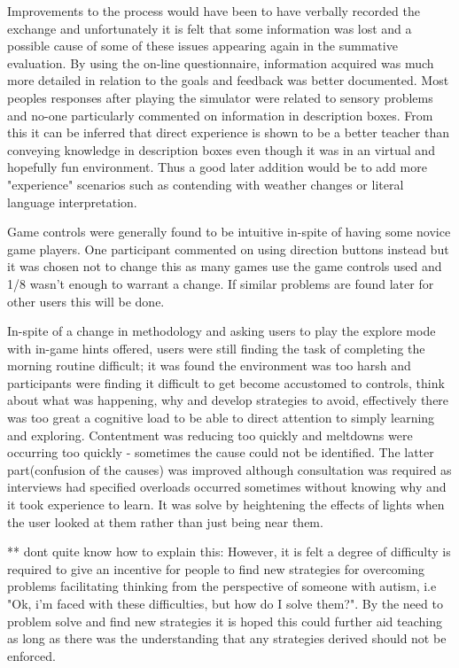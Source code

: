 \documentclass[11pt]{report}
\begin{document}
Improvements to the process would have been to have verbally recorded the exchange and unfortunately it is felt that some information was lost and a possible cause of some of these issues appearing again in the summative evaluation. By using the on-line questionnaire, information acquired was much more detailed in relation to the goals and feedback was better documented. Most peoples responses after playing the simulator were related to sensory problems and no-one particularly commented on information in description boxes. From this it can be inferred that direct experience is shown to be a better teacher than conveying knowledge in description boxes even though it was in an virtual and hopefully fun environment. Thus a good later addition would be to add more "experience" scenarios such as contending with weather changes or literal language interpretation.  

Game controls were generally found to be intuitive in-spite of having some novice game players. One participant commented on using direction buttons instead but it was chosen not to change this as many games use the game controls used and 1/8 wasn't enough to warrant a change. If similar problems are found later for other users this will be done. 

In-spite of a change in methodology and asking users to play the explore mode with in-game hints offered, users were still finding the task of completing the morning routine difficult; it was found the environment was too harsh and participants were finding it difficult to get become accustomed to controls, think about what was happening, why and develop strategies to avoid, effectively there was too great a cognitive load to be able to direct attention to simply learning and exploring. Contentment was reducing too quickly and meltdowns were occurring too quickly - sometimes the cause could not be identified. The latter part(confusion of the causes) was improved although consultation was required as interviews had specified overloads occurred sometimes without knowing why and it took experience to learn. It was solve by heightening the effects of lights when the user looked at them rather than just being near them.

** dont quite know how to explain this: However, it is felt a degree of difficulty is required to give an incentive for people to find new strategies for overcoming problems facilitating thinking from the perspective of someone with autism, i.e "Ok, i'm faced with these difficulties, but how do I solve them?". By the need to problem solve and find new strategies it is hoped this could further aid teaching as long as there was the understanding that any strategies derived should not be enforced. 
\end{document}
